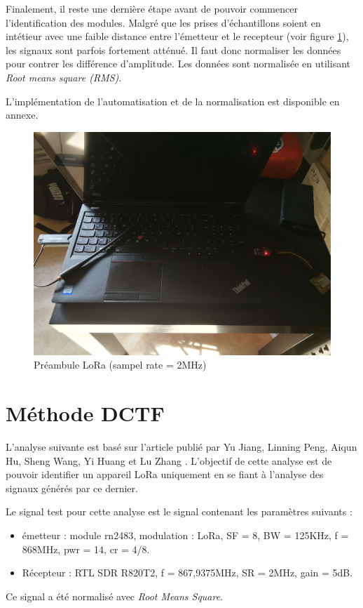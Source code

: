 Finalement, il reste une dernière étape avant de pouvoir commencer l'identification des modules. Malgré que les prises d'échantillons soient en intétieur avec une faible distance entre l'émetteur et le recepteur (voir figure \ref{term312}), les signaux sont parfois fortement atténué. Il faut donc normaliser les données pour contrer les différence d'amplitude. Les données sont normalisée en utilisant \textit{Root means square (RMS)}.

L'implémentation de l'automatisation et de la normalisation est disponible en annexe.

\begin{figure}[h]
\centering

\includegraphics[width=\textwidth]{images/conf1.png}
\caption{Préambule LoRa (sampel rate = 2MHz)}\label{term312}
\end{figure}



\section{Méthode DCTF}

L'analyse suivante est basé sur l'article publié par Yu Jiang, Linning Peng, Aiqun Hu, Sheng Wang, Yi Huang et Lu Zhang \cite{loraDCTF}. L'objectif de cette analyse est de pouvoir identifier un appareil LoRa uniquement en se fiant à l'analyse des signaux générés par ce dernier. 

Le signal test pour cette analyse est le signal contenant les paramètres suivants :
\begin{itemize}
\item émetteur : module rn2483, modulation : LoRa, SF = 8, BW = 125KHz, f = 868MHz, pwr = 14, cr = 4/8.
\item Récepteur : RTL SDR R820T2, f = 867,9375MHz, SR = 2MHz, gain = 5dB.
\end{itemize}
Ce signal a été normalisé avec \textit{Root Means Square}.



